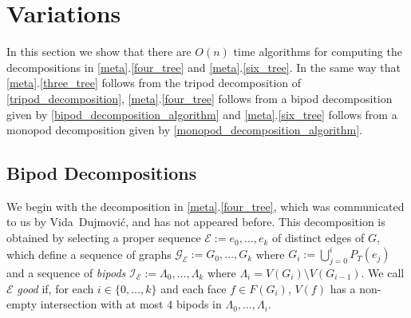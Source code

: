 \documentclass{patmorin}
\begin{document}
\section{Variations}
\label{variants}

In this section we show that there are $O(n)$ time algorithms for computing the decompositions in \cref{meta}.\ref{four_tree} and \cref{meta}.\ref{six_tree}.  In the same way that \cref{meta}.\ref{three_tree} follows from the tripod decomposition of \cref{tripod_decomposition}, \cref{meta}.\ref{four_tree} follows from a bipod decomposition given by \cref{bipod_decomposition_algorithm} and \cref{meta}.\ref{six_tree} follows from a monopod decomposition given by \cref{monopod_decomposition_algorithm}.




%

\subsection{Bipod Decompositions}

We begin with the decomposition in \cref{meta}.\ref{four_tree}, which was communicated to us by Vida~Dujmović, and has not appeared before.  This decomposition is obtained by selecting a proper sequence $\mathcal{E}:=e_0,\ldots,e_k$ of distinct edges of $G$, which define a sequence of graphs $\mathcal{G_E}:=G_{0},\ldots,G_k$ where $G_i:=\bigcup_{j=0}^i P_T(e_j)$ and a sequence of \emph{bipods} $\mathcal{I_E}:=\Lambda_0,\ldots,\Lambda_k$ where $\Lambda_i=V(G_i)\setminus V(G_{i-1})$.  We call $\mathcal{E}$ \emph{good} if, for each $i\in\{0,\ldots,k\}$ and each face $f\in F(G_i)$, $V(f)$ has a non-empty intersection with at most $4$ bipods in $\Lambda_0,\ldots,\Lambda_i$.
\end{document}
